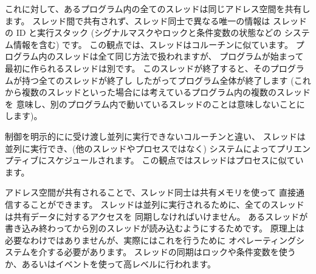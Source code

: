 これに対して、あるプログラム内の全てのスレッドは同じアドレス空間を共有します。
スレッド間で共有されず、スレッド同士で異なる唯一の情報は
スレッドの ID と実行スタック (シグナルマスクやロックと条件変数の状態などの
システム情報を含む) です。
この観点では、スレッドはコルーチンに似ています。
プログラム内のスレッドは全て同じ方法で扱われますが、
プログラムが始まって最初に作られるスレッドは別です。
このスレッドが終了すると、そのプログラムが持つ全てのスレッドが終了し
したがってプログラム全体が終了します
(これから複数のスレッドといった場合には考えているプログラム内の複数のスレッドを
意味し、別のプログラム内で動いているスレッドのことは意味しないことにします)。

制御を明示的にに受け渡し並列に実行できないコルーチンと違い、
スレッドは並列に実行でき、(他のスレッドやプロセスではなく)
システムによってプリエンプティブにスケジュールされます。
この観点ではスレッドはプロセスに似ています。

アドレス空間が共有されることで、スレッド同士は共有メモリを使って
直接通信することができます。
スレッドは並列に実行されるために、全てのスレッドは共有データに対するアクセスを
同期しなければいけません。
あるスレッドが書き込み終わってから別のスレッドが読み込むようにするためです。
原理上は必要なわけではありませんが、実際にはこれを行うために
オペレーティングシステムを介する必要があります。
スレッドの同期はロックや条件変数を使うか、あるいはイベントを使って高レベルに行われます。

